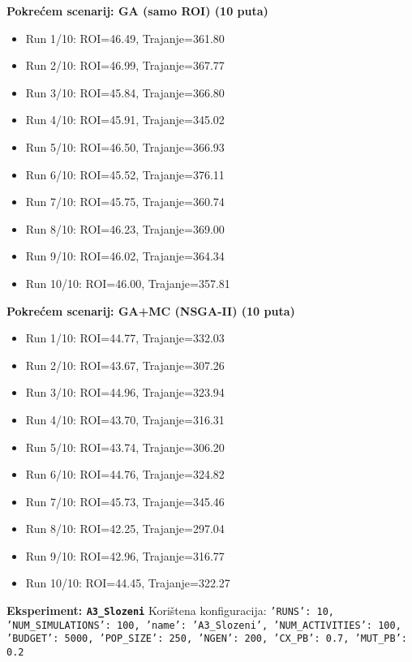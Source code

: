 \textbf{Pokrećem scenarij: GA (samo ROI) (10 puta)}
\begin{itemize}
    \item Run 1/10: ROI=46.49, Trajanje=361.80
    \item Run 2/10: ROI=46.99, Trajanje=367.77
    \item Run 3/10: ROI=45.84, Trajanje=366.80
    \item Run 4/10: ROI=45.91, Trajanje=345.02
    \item Run 5/10: ROI=46.50, Trajanje=366.93
    \item Run 6/10: ROI=45.52, Trajanje=376.11
    \item Run 7/10: ROI=45.75, Trajanje=360.74
    \item Run 8/10: ROI=46.23, Trajanje=369.00
    \item Run 9/10: ROI=46.02, Trajanje=364.34
    \item Run 10/10: ROI=46.00, Trajanje=357.81
\end{itemize}

\textbf{Pokrećem scenarij: GA+MC (NSGA-II) (10 puta)}
\begin{itemize}
    \item Run 1/10: ROI=44.77, Trajanje=332.03
    \item Run 2/10: ROI=43.67, Trajanje=307.26
    \item Run 3/10: ROI=44.96, Trajanje=323.94
    \item Run 4/10: ROI=43.70, Trajanje=316.31
    \item Run 5/10: ROI=43.74, Trajanje=306.20
    \item Run 6/10: ROI=44.76, Trajanje=324.82
    \item Run 7/10: ROI=45.73, Trajanje=345.46
    \item Run 8/10: ROI=42.25, Trajanje=297.04
    \item Run 9/10: ROI=42.96, Trajanje=316.77
    \item Run 10/10: ROI=44.45, Trajanje=322.27
\end{itemize}

\textbf{Eksperiment: \texttt{A3\_Slozeni}}
Korištena konfiguracija: \texttt{'RUNS': 10, 'NUM\_SIMULATIONS': 100, 'name': 'A3\_Slozeni', 'NUM\_ACTIVITIES': 100, 'BUDGET': 5000, 'POP\_SIZE': 250, 'NGEN': 200, 'CX\_PB': 0.7, 'MUT\_PB': 0.2}

